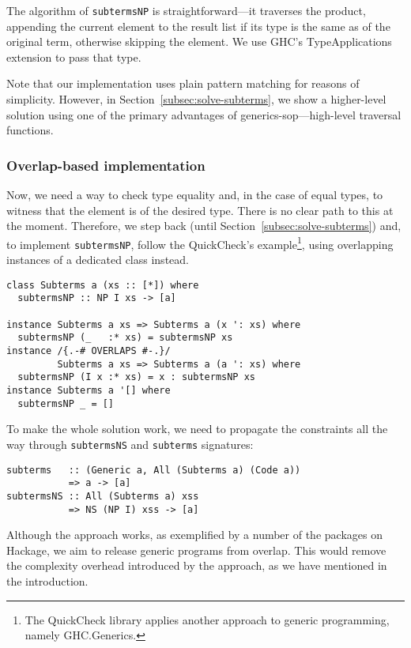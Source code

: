 \documentclass[runningheads]{llncs}
\newcommand{\K}[1]{\lstinline[style=fancy]{#1}}
\begin{document}
The algorithm of \K{subtermsNP} is straightforward---it traverses the product, appending the current element to the result list if its type is the same as of the original term, otherwise skipping the element. We use GHC's \textsf{TypeApplications} extension to pass that type.

Note that our implementation uses plain pattern matching for reasons of simplicity. However, in Section~\ref{subsec:solve-subterms}, we show a higher-level solution using one of the primary advantages of \textsf{generics-sop}---high-level traversal functions.

\subsubsection{Overlap-based implementation}

Now, we need a way to check type equality and, in the case of equal types, to witness that the element is of the desired type. There is no clear path to this at the moment. Therefore, we step back (until Section~\ref{subsec:solve-subterms}) and, to implement \K{subtermsNP}, follow the \textsf{QuickCheck}'s example\footnote{The \textsf{QuickCheck} library applies another approach to generic programming, namely \textsf{GHC.Generics}.}, using overlapping instances of a dedicated class instead.
\begin{lstlisting}[style=fancy]
class Subterms a (xs :: [*]) where
  subtermsNP :: NP I xs -> [a]

instance Subterms a xs => Subterms a (x ': xs) where
  subtermsNP (_   :* xs) = subtermsNP xs
instance /{.-# OVERLAPS #-.}/
         Subterms a xs => Subterms a (a ': xs) where
  subtermsNP (I x :* xs) = x : subtermsNP xs
instance Subterms a '[] where
  subtermsNP _ = []
\end{lstlisting}

To make the whole solution work, we need to propagate the constraints all the way through \K{subtermsNS} and \K{subterms} signatures:
\begin{lstlisting}[style=fancy]
subterms   :: (Generic a, All (Subterms a) (Code a))
           => a -> [a]
subtermsNS :: All (Subterms a) xss
           => NS (NP I) xss -> [a]
\end{lstlisting}

Although the approach works, as exemplified by a number of the packages on Hackage, we aim to release generic programs from overlap. This would remove the complexity overhead introduced by the approach, as we have mentioned in the introduction.
\end{document}
